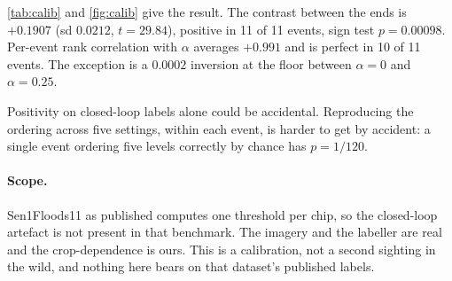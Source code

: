 \cref{tab:calib} and \cref{fig:calib} give the result. The contrast between the ends
is $+0.1907$ (sd $0.0212$, $t = 29.84$), positive in 11 of 11 events, sign test
$p = 0.00098$. Per-event rank correlation with $\alpha$ averages $+0.991$ and is
perfect in 10 of 11 events. The exception is a $0.0002$ inversion at the floor
between $\alpha = 0$ and $\alpha = 0.25$.

Positivity on closed-loop labels alone could be accidental. Reproducing the
ordering across five settings, within each event, is harder to get by accident: a
single event ordering five levels correctly by chance has $p = 1/120$.

\paragraph{Scope.} Sen1Floods11 as published computes one threshold per chip, so the
closed-loop artefact is not present in that benchmark. The imagery and the labeller
are real and the crop-dependence is ours. This is a calibration, not a second
sighting in the wild, and nothing here bears on that dataset's published labels.

